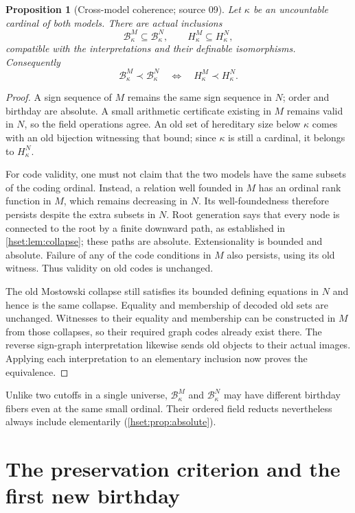 \documentclass[11pt,letterpaper]{article}
\newtheorem{proposition}[proposition]{Proposition}\aliascntresetthe{proposition}
\theoremstyle{definition}
\theoremstyle{remark}
\newcommand{\B}{\mathcal B}
\begin{document}
\begin{proposition}[Cross-model coherence; source 09]
\label{hset:prop:cross-model}
Let $\kappa$ be an uncountable cardinal of both models. There are actual
inclusions
\[
 \B_\kappa^M\subseteq\B_\kappa^N,
 \qquad H_\kappa^M\subseteq H_\kappa^N,
\]
compatible with the interpretations and their definable isomorphisms.
Consequently
\[
 \B_\kappa^M\prec\B_\kappa^N
 \quad\Longleftrightarrow\quad H_\kappa^M\prec H_\kappa^N.
\]
\end{proposition}
\begin{proof}
A sign sequence of $M$ remains the same sign sequence in $N$; order and
birthday are absolute. A small arithmetic certificate existing in $M$
remains valid in $N$, so the field operations agree. An old set of hereditary
size below $\kappa$ comes with an old bijection witnessing that bound; since
$\kappa$ is still a cardinal, it belongs to $H_\kappa^N$.

For code validity, one must not claim that the two models have the same
subsets of the coding ordinal. Instead, a relation well founded in $M$ has
an ordinal rank function in $M$, which remains decreasing in $N$. Its
well-foundedness therefore persists despite the extra subsets in $N$.
Root generation says that every node is connected to the root by a finite
downward path, as established in \cref{hset:lem:collapse}; these paths are
absolute. Extensionality is bounded and absolute. Failure of any of the
code conditions in $M$ also persists, using its old witness. Thus validity
on old codes is unchanged.

The old Mostowski collapse still satisfies its bounded defining equations
in $N$ and hence is the same collapse. Equality and membership of decoded
old sets are unchanged. Witnesses to their equality and membership can be
constructed in $M$ from those collapses, so their required graph codes
already exist there. The reverse sign-graph interpretation likewise sends
old objects to their actual images. Applying each interpretation to an
elementary inclusion now proves the equivalence.
\end{proof}

Unlike two cutoffs in a single universe, $\B^M_\kappa$ and $\B^N_\kappa$ may
have different birthday fibers even at the same small ordinal. Their ordered
field reducts nevertheless always include elementarily
(\cref{hset:prop:absolute}).

\section{The preservation criterion and the first new birthday}
\label{hset:sec:preservation}
\end{document}
